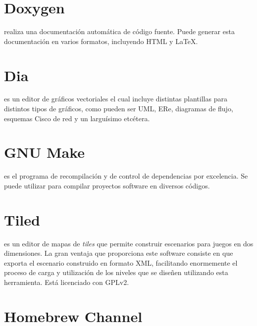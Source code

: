 



\section*{Doxygen}

 \cite{website:doxygen} realiza una documentación automática de código fuente. Puede generar esta documentación en varios formatos, incluyendo HTML y \LaTeX{}.

\section*{Dia}

 es un editor de gráficos vectoriales el cual incluye distintas plantillas para distintos tipos de gráficos, como pueden ser UML, ERe, diagramas de flujo, esquemas Cisco de red y un larguísimo etcétera.

\section*{GNU Make}

 \cite{website:make} \cite{pdf:make} es el programa de recompilación y de control de dependencias por excelencia. Se puede utilizar para compilar proyectos software en diversos códigos.

\section*{Tiled}

 \cite{website:tiled} es un editor de mapas de \emph{tiles} que permite construir escenarios para juegos en dos dimensiones. La gran ventaja que proporciona este software consiste en que exporta el escenario construido en formato XML, facilitando enormemente el proceso de carga y utilización de los niveles que se diseñen utilizando esta herramienta. Está licenciado con GPLv2.

\section*{Homebrew Channel}

